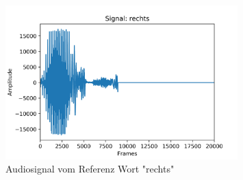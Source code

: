 \documentclass[12pt, oneside, a4paper, \docLanguage]{report}
\begin{document}
\begin{normalsize}
\begin{figure}[H]
\centering
	\includegraphics[width=0.8\textwidth]{../Images/rechts_signal.png}
	\caption{Audiosignal vom Referenz Wort "rechts"}
\end{figure}
\end{normalsize}

\pagebreak
\end{document}
